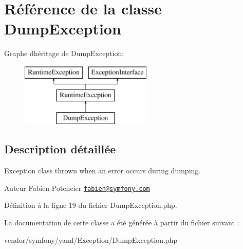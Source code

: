 \hypertarget{class_symfony_1_1_component_1_1_yaml_1_1_exception_1_1_dump_exception}{}\section{Référence de la classe Dump\+Exception}
\label{class_symfony_1_1_component_1_1_yaml_1_1_exception_1_1_dump_exception}
Graphe d\textquotesingle{}héritage de Dump\+Exception\+:\begin{figure}[H]
\begin{center}
\leavevmode
\includegraphics[height=3.000000cm]{class_symfony_1_1_component_1_1_yaml_1_1_exception_1_1_dump_exception}
\end{center}
\end{figure}


\subsection{Description détaillée}
Exception class thrown when an error occurs during dumping.

\begin{DoxyAuthor}{Auteur}
Fabien Potencier \href{mailto:fabien@symfony.com}{\tt fabien@symfony.\+com} 
\end{DoxyAuthor}


Définition à la ligne 19 du fichier Dump\+Exception.\+php.



La documentation de cette classe a été générée à partir du fichier suivant \+:\begin{DoxyCompactItemize}
\item 
vendor/symfony/yaml/\+Exception/Dump\+Exception.\+php\end{DoxyCompactItemize}
